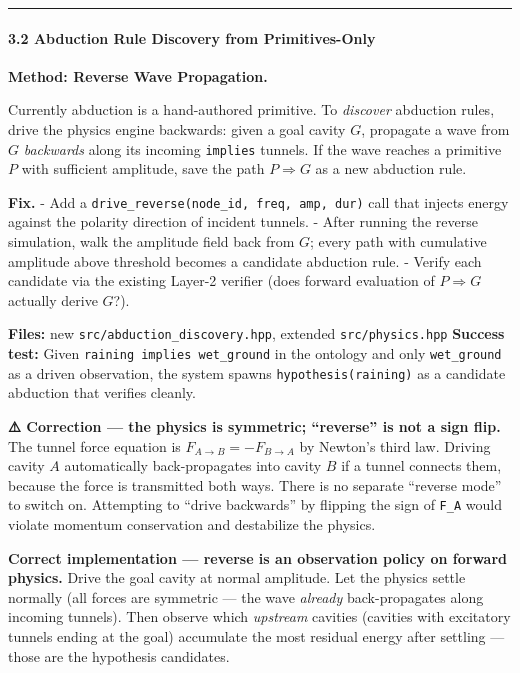 \documentclass[
  11pt,
  a4paper,
]{article}
\begin{document}
\begin{center}\rule{0.5\linewidth}{0.5pt}\end{center}

\paragraph{3.2 Abduction Rule Discovery from
Primitives-Only}\label{abduction-rule-discovery-from-primitives-only}

\textbf{Method: Reverse Wave Propagation.}

Currently abduction is a hand-authored primitive. To \emph{discover}
abduction rules, drive the physics engine backwards: given a goal cavity
\(G\), propagate a wave from \(G\) \emph{backwards} along its incoming
\texttt{implies} tunnels. If the wave reaches a primitive \(P\) with
sufficient amplitude, save the path \(P \Rightarrow G\) as a new
abduction rule.

\textbf{Fix.} - Add a
\texttt{drive\_reverse(node\_id,\ freq,\ amp,\ dur)} call that injects
energy against the polarity direction of incident tunnels. - After
running the reverse simulation, walk the amplitude field back from
\(G\); every path with cumulative amplitude above threshold becomes a
candidate abduction rule. - Verify each candidate via the existing
Layer-2 verifier (does forward evaluation of \(P \Rightarrow G\)
actually derive \(G\)?).

\textbf{Files:} new \texttt{src/abduction\_discovery.hpp}, extended
\texttt{src/physics.hpp} \textbf{Success test:} Given
\texttt{raining\ implies\ wet\_ground} in the ontology and only
\texttt{wet\_ground} as a driven observation, the system spawns
\texttt{hypothesis(raining)} as a candidate abduction that verifies
cleanly.

\textbf{⚠️ Correction --- the physics is symmetric; ``reverse'' is not a
sign flip.} The tunnel force equation is \(F_{A \to B} = -F_{B \to A}\)
by Newton's third law. Driving cavity \(A\) automatically
back-propagates into cavity \(B\) if a tunnel connects them, because the
force is transmitted both ways. There is no separate ``reverse mode'' to
switch on. Attempting to ``drive backwards'' by flipping the sign of
\texttt{F\_A} would violate momentum conservation and destabilize the
physics.

\textbf{Correct implementation --- reverse is an observation policy on
forward physics.} Drive the goal cavity at normal amplitude. Let the
physics settle normally (all forces are symmetric --- the wave
\emph{already} back-propagates along incoming tunnels). Then observe
which \emph{upstream} cavities (cavities with excitatory tunnels ending
at the goal) accumulate the most residual energy after settling ---
those are the hypothesis candidates.
\end{document}
